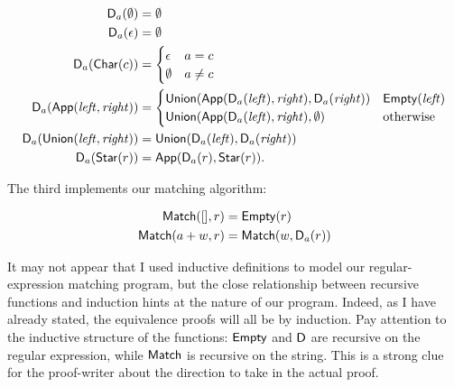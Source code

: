 \begin{align*}
    \mathsf{D}_a(\emptyset) &= \emptyset \\
    \mathsf{D}_a(\epsilon) &= \emptyset \\
    \mathsf{D}_a(\mathsf{Char}(c)) &= \begin{cases}
        \epsilon & a = c \\
        \emptyset & a \neq c
    \end{cases} \\
    \mathsf{D}_a(\mathsf{App}(\mathit{left}, \mathit{right})) &= \begin{cases}
        \mathsf{Union}(\mathsf{App}(\mathsf{D}_a(\mathit{left}), \mathit{right}),
                     \mathsf{D}_a(\mathit{right})) & \mathsf{Empty}(\mathit{left}) \\
        \mathsf{Union}(\mathsf{App}(\mathsf{D}_a(\mathit{left}), \mathit{right}),
                     \emptyset) & \text{otherwise}
    \end{cases} \\
    \mathsf{D}_a(\mathsf{Union}(\mathit{left}, \mathit{right})) &=
        \mathsf{Union}(\mathsf{D}_a(\mathit{left}), \mathsf{D}_a(\mathit{right})) \\
    \mathsf{D}_a(\mathsf{Star}(r)) &= \mathsf{App}(\mathsf{D}_a(r), \mathsf{Star}(r)).
\end{align*}

The third implements our matching algorithm:

\begin{align*}
    \mathsf{Match}([], r) &= \mathsf{Empty}(r) \\
    \mathsf{Match}(a+w, r) &= \mathsf{Match}(w, \mathsf{D}_a(r))
\end{align*}

It may not appear that I used inductive definitions to model our
regular-expression matching program, but the close relationship between
recursive functions and induction hints at the nature of our program. Indeed, as
I have already stated, the equivalence proofs will all be by induction. Pay
attention to the inductive structure of the functions: \(\mathsf{Empty}\) and
\(\mathsf{D}\) are recursive on the regular expression, while \(\mathsf{Match}\) is
recursive on the string. This is a strong clue for the proof-writer about the
direction to take in the actual proof.

